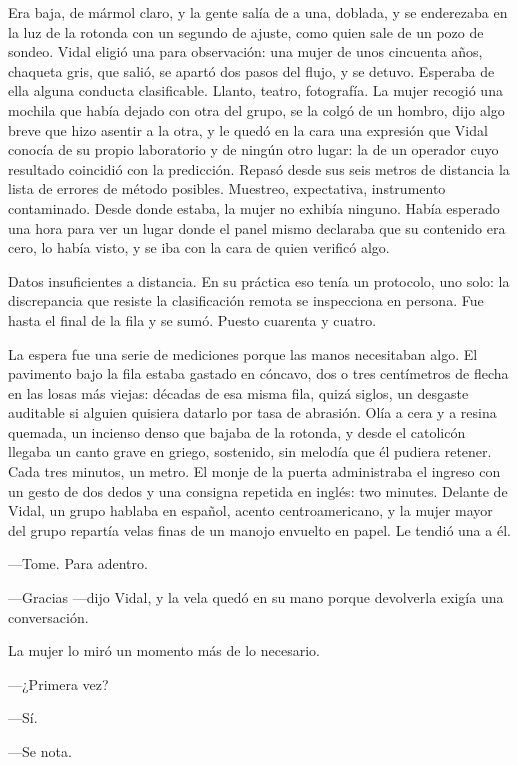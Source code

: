 Era baja, de mármol claro, y la gente salía de a una, doblada, y se enderezaba en la luz de la rotonda con un segundo de ajuste, como quien sale de un pozo de sondeo. Vidal eligió una para observación: una mujer de unos cincuenta años, chaqueta gris, que salió, se apartó dos pasos del flujo, y se detuvo. Esperaba de ella alguna conducta clasificable. Llanto, teatro, fotografía. La mujer recogió una mochila que había dejado con otra del grupo, se la colgó de un hombro, dijo algo breve que hizo asentir a la otra, y le quedó en la cara una expresión que Vidal conocía de su propio laboratorio y de ningún otro lugar: la de un operador cuyo resultado coincidió con la predicción. Repasó desde sus seis metros de distancia la lista de errores de método posibles. Muestreo, expectativa, instrumento contaminado. Desde donde estaba, la mujer no exhibía ninguno. Había esperado una hora para ver un lugar donde el panel mismo declaraba que su contenido era cero, lo había visto, y se iba con la cara de quien verificó algo.

Datos insuficientes a distancia. En su práctica eso tenía un protocolo, uno solo: la discrepancia que resiste la clasificación remota se inspecciona en persona. Fue hasta el final de la fila y se sumó. Puesto cuarenta y cuatro.

La espera fue una serie de mediciones porque las manos necesitaban algo. El pavimento bajo la fila estaba gastado en cóncavo, dos o tres centímetros de flecha en las losas más viejas: décadas de esa misma fila, quizá siglos, un desgaste auditable si alguien quisiera datarlo por tasa de abrasión. Olía a cera y a resina quemada, un incienso denso que bajaba de la rotonda, y desde el catolicón llegaba un canto grave en griego, sostenido, sin melodía que él pudiera retener. Cada tres minutos, un metro. El monje de la puerta administraba el ingreso con un gesto de dos dedos y una consigna repetida en inglés: two minutes. Delante de Vidal, un grupo hablaba en español, acento centroamericano, y la mujer mayor del grupo repartía velas finas de un manojo envuelto en papel. Le tendió una a él.

---Tome. Para adentro.

---Gracias ---dijo Vidal, y la vela quedó en su mano porque devolverla exigía una conversación.

La mujer lo miró un momento más de lo necesario.

---¿Primera vez?

---Sí.

---Se nota.

